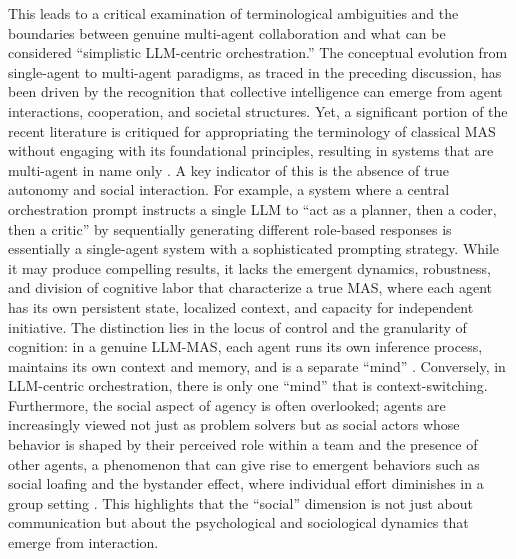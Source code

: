 \documentclass[11pt]{article}
\begin{document}
This leads to a critical examination of terminological ambiguities and the boundaries between genuine multi-agent collaboration and what can be considered ``simplistic LLM-centric orchestration.'' The conceptual evolution from single-agent to multi-agent paradigms, as traced in the preceding discussion, has been driven by the recognition that collective intelligence can emerge from agent interactions, cooperation, and societal structures. Yet, a significant portion of the recent literature is critiqued for appropriating the terminology of classical MAS without engaging with its foundational principles, resulting in systems that are multi-agent in name only \cite{ref5}. A key indicator of this is the absence of true autonomy and social interaction. For example, a system where a central orchestration prompt instructs a single LLM to ``act as a planner, then a coder, then a critic'' by sequentially generating different role-based responses is essentially a single-agent system with a sophisticated prompting strategy. While it may produce compelling results, it lacks the emergent dynamics, robustness, and division of cognitive labor that characterize a true MAS, where each agent has its own persistent state, localized context, and capacity for independent initiative. The distinction lies in the locus of control and the granularity of cognition: in a genuine LLM-MAS, each agent runs its own inference process, maintains its own context and memory, and is a separate ``mind'' \cite{ref8}. Conversely, in LLM-centric orchestration, there is only one ``mind'' that is context-switching. Furthermore, the social aspect of agency is often overlooked; agents are increasingly viewed not just as problem solvers but as social actors whose behavior is shaped by their perceived role within a team and the presence of other agents, a phenomenon that can give rise to emergent behaviors such as social loafing and the bystander effect, where individual effort diminishes in a group setting \cite{ref9}. This highlights that the ``social'' dimension is not just about communication but about the psychological and sociological dynamics that emerge from interaction.
\end{document}
